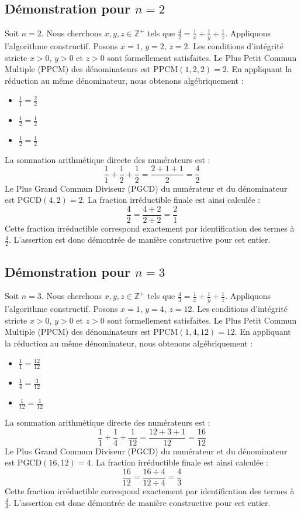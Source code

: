 \documentclass[11pt,a4paper]{article}
\begin{document}
\subsection{Démonstration pour $n = 2$}
Soit $n = 2$. Nous cherchons $x, y, z \in \mathbb{Z}^{+}$ tels que $\frac{4}{2} = \frac{1}{x} + \frac{1}{y} + \frac{1}{z}$.
Appliquons l'algorithme constructif. Posons $x = 1$, $y = 2$, $z = 2$.
Les conditions d'intégrité stricte $x > 0$, $y > 0$ et $z > 0$ sont formellement satisfaites.
Le Plus Petit Commun Multiple (PPCM) des dénominateurs est $\text{PPCM}(1, 2, 2) = 2$.
En appliquant la réduction au même dénominateur, nous obtenons algébriquement :
\begin{itemize}
    \item $\frac{1}{1} = \frac{2}{2}$
    \item $\frac{1}{2} = \frac{1}{2}$
    \item $\frac{1}{2} = \frac{1}{2}$
\end{itemize}
La sommation arithmétique directe des numérateurs est :
$$ \frac{1}{1} + \frac{1}{2} + \frac{1}{2} = \frac{2 + 1 + 1}{2} = \frac{4}{2} $$
Le Plus Grand Commun Diviseur (PGCD) du numérateur et du dénominateur est $\text{PGCD}(4, 2) = 2$.
La fraction irréductible finale est ainsi calculée :
$$ \frac{4}{2} = \frac{4 \div 2}{2 \div 2} = \frac{2}{1} $$
Cette fraction irréductible correspond exactement par identification des termes à $\frac{4}{2}$. L'assertion est donc démontrée de manière constructive pour cet entier.

\subsection{Démonstration pour $n = 3$}
Soit $n = 3$. Nous cherchons $x, y, z \in \mathbb{Z}^{+}$ tels que $\frac{4}{3} = \frac{1}{x} + \frac{1}{y} + \frac{1}{z}$.
Appliquons l'algorithme constructif. Posons $x = 1$, $y = 4$, $z = 12$.
Les conditions d'intégrité stricte $x > 0$, $y > 0$ et $z > 0$ sont formellement satisfaites.
Le Plus Petit Commun Multiple (PPCM) des dénominateurs est $\text{PPCM}(1, 4, 12) = 12$.
En appliquant la réduction au même dénominateur, nous obtenons algébriquement :
\begin{itemize}
    \item $\frac{1}{1} = \frac{12}{12}$
    \item $\frac{1}{4} = \frac{3}{12}$
    \item $\frac{1}{12} = \frac{1}{12}$
\end{itemize}
La sommation arithmétique directe des numérateurs est :
$$ \frac{1}{1} + \frac{1}{4} + \frac{1}{12} = \frac{12 + 3 + 1}{12} = \frac{16}{12} $$
Le Plus Grand Commun Diviseur (PGCD) du numérateur et du dénominateur est $\text{PGCD}(16, 12) = 4$.
La fraction irréductible finale est ainsi calculée :
$$ \frac{16}{12} = \frac{16 \div 4}{12 \div 4} = \frac{4}{3} $$
Cette fraction irréductible correspond exactement par identification des termes à $\frac{4}{3}$. L'assertion est donc démontrée de manière constructive pour cet entier.
\end{document}
